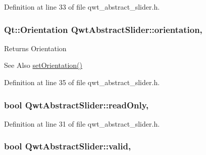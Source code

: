 Definition at line 33 of file qwt\-\_\-abstract\-\_\-slider.\-h.

\hypertarget{class_qwt_abstract_slider_ac6a51cf8c6e298be121c7bab1fdb4376}{
\subsubsection[{orientation}]{\setlength{\rightskip}{0pt plus 5cm}Qt\-::\-Orientation Qwt\-Abstract\-Slider\-::orientation\hspace{0.3cm}{\ttfamily [read]}, {\ttfamily [write]}}}\label{class_qwt_abstract_slider_ac6a51cf8c6e298be121c7bab1fdb4376}
\begin{DoxyReturn}{Returns}
Orientation 
\end{DoxyReturn}
\begin{DoxySeeAlso}{See Also}
\hyperlink{class_qwt_abstract_slider_a6b0fdc50bfbb0a8bb40f0dc6bf493b2c}{set\-Orientation()} 
\end{DoxySeeAlso}


Definition at line 35 of file qwt\-\_\-abstract\-\_\-slider.\-h.

\hypertarget{class_qwt_abstract_slider_ad7074d3448c265bcb4d9c317b38812be}{
\subsubsection[{read\-Only}]{\setlength{\rightskip}{0pt plus 5cm}bool Qwt\-Abstract\-Slider\-::read\-Only\hspace{0.3cm}{\ttfamily [read]}, {\ttfamily [write]}}}\label{class_qwt_abstract_slider_ad7074d3448c265bcb4d9c317b38812be}


Definition at line 31 of file qwt\-\_\-abstract\-\_\-slider.\-h.

\hypertarget{class_qwt_abstract_slider_a65a589ff3bbfdeb3b5f099bbf7c5e45a}{
\subsubsection[{valid}]{\setlength{\rightskip}{0pt plus 5cm}bool Qwt\-Abstract\-Slider\-::valid\hspace{0.3cm}{\ttfamily [read]}, {\ttfamily [write]}}}\label{class_qwt_abstract_slider_a65a589ff3bbfdeb3b5f099bbf7c5e45a}


